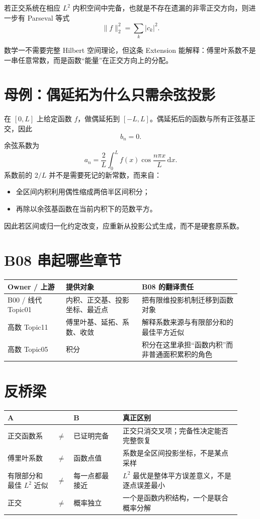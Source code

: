 \documentclass[profile=standard]{ipara-handbook}
\begin{document}
若正交系统在相应 $L^2$ 内积空间中完备，也就是不存在遗漏的非零正交方向，则进一步有 Parseval 等式
\[
\lVert f\rVert_2^2=\sum_k\lvert c_k\rvert^2.
\]

数学一不需要完整 Hilbert 空间理论，但这条 Extension 能解释：傅里叶系数不是一串任意常数，而是函数“能量”在正交方向上的分配。

\section{母例：偶延拓为什么只需余弦投影}
在 $[0,L]$ 上给定函数 $f$，做偶延拓到 $[-L,L]$。偶延拓后的函数与所有正弦基正交，因此
\[
b_n=0.
\]
余弦系数为
\[
a_n=\frac2L\int_0^L f(x)\cos\frac{n\pi x}{L}\,\mathrm{d}x.
\]
系数前的 $2/L$ 并不是需要死记的新常数，而来自：
\begin{itemize}
\item 全区间内积利用偶性缩成两倍半区间积分；
\item 再除以余弦基函数在当前内积下的范数平方。
\end{itemize}

因此若区间或归一化约定改变，应重新从投影公式生成，而不是硬套原系数。

\section{B08 串起哪些章节}
\begin{tabular}{p{0.23\linewidth}p{0.30\linewidth}p{0.39\linewidth}}
\hline
Owner / 上游 & 提供对象 & B08 的翻译责任\\
\hline
B00 / 线代 Topic01 & 内积、正交基、投影坐标、最近点 & 把有限维投影机制迁移到函数对象\\
高数 Topic11 & 傅里叶基、延拓、系数、收敛 & 解释系数来源与有限部分和的最佳平方近似\\
高数 Topic05 & 积分 & 积分在这里承担“函数内积”而非普通面积累积的角色\\
\hline
\end{tabular}

\section{反桥梁}
\begin{tabular}{p{0.20\linewidth}p{0.04\linewidth}p{0.20\linewidth}p{0.48\linewidth}}
\hline
A & & B & 真正区别\\
\hline
正交函数系 & $\neq$ & 已证明完备 & 正交只消交叉项；完备性决定能否完整恢复\\
傅里叶系数 & $\neq$ & 函数点值 & 系数是全区间投影坐标，不是某点采样\\
有限部分和最佳 $L^2$ 近似 & $\neq$ & 每一点都最接近 & $L^2$ 最优是整体平方误差意义，不是逐点误差最小\\
正交 & $\neq$ & 概率独立 & 一个是函数内积结构，一个是联合概率分解\\
\hline
\end{tabular}
\end{document}
